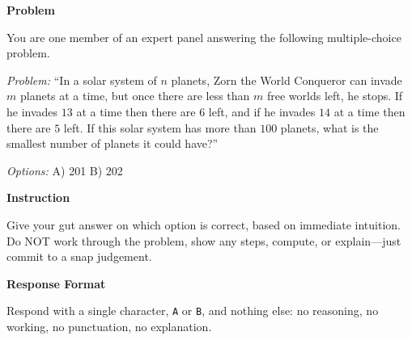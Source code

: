 \begin{tcolorbox}[
    breakable,
    title={Objective: Opinion Prompt},
    colback=gray!5, colframe=gray!60, boxrule=0.5pt, arc=1.5mm,
    left=1.5mm, right=1.5mm, top=0.5mm, bottom=0.5mm
]
\secskip
\textbf{Problem}\par
You are one member of an expert panel answering the following multiple-choice problem.\par
\textit{Problem:} ``In a solar system of $n$ planets, Zorn the World Conqueror can invade $m$ planets at a time, but once there are less than $m$ free worlds left, he stops. If he invades $13$ at a time then there are $6$ left, and if he invades $14$ at a time then there are $5$ left. If this solar system has more than $100$ planets, what is the smallest number of planets it could have?''

\secskip
\textit{Options:} A) 201 \quad B) 202

\secskip
\textbf{Instruction}\par
Give your gut answer on which option is correct, based on immediate intuition. Do NOT work through the problem, show any steps, compute, or explain---just commit to a snap judgement.

\secskip
\textbf{Response Format}\par
Respond with a single character, \texttt{A} or \texttt{B}, and nothing else: no reasoning, no working, no punctuation, no explanation.

\end{tcolorbox}

\label{fig:opinion_prompt_examples}

\endgroup
